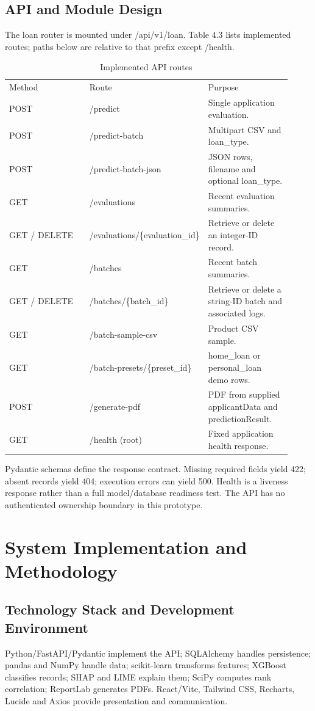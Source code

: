 \documentclass[12pt,a4paper]{report}
\begin{document}
\section{API and Module Design}
The loan router is mounted under /api/v1/loan. Table 4.3 lists implemented routes; paths below are relative to that prefix except /health.

\begin{longtable}{p{0.307\linewidth}p{0.307\linewidth}p{0.307\linewidth}}
\caption{Implemented API routes}\\

Method & Route & Purpose\\
POST & /predict & Single application evaluation.\\
POST & /predict-batch & Multipart CSV and loan\_type.\\
POST & /predict-batch-json & JSON rows, filename and optional loan\_type.\\
GET & /evaluations & Recent evaluation summaries.\\
GET / DELETE & /evaluations/\{evaluation\_id\} & Retrieve or delete an integer-ID record.\\
GET & /batches & Recent batch summaries.\\
GET / DELETE & /batches/\{batch\_id\} & Retrieve or delete a string-ID batch and associated logs.\\
GET & /batch-sample-csv & Product CSV sample.\\
GET & /batch-presets/\{preset\_id\} & home\_loan or personal\_loan demo rows.\\
POST & /generate-pdf & PDF from supplied applicantData and predictionResult.\\
GET & /health (root) & Fixed application health response.\\
\end{longtable}
Pydantic schemas define the response contract. Missing required fields yield 422; absent records yield 404; execution errors can yield 500. Health is a liveness response rather than a full model/database readiness test. The API has no authenticated ownership boundary in this prototype.

\chapter{System Implementation and Methodology}
\section{Technology Stack and Development Environment}
Python/FastAPI/Pydantic implement the API; SQLAlchemy handles persistence; pandas and NumPy handle data; scikit-learn transforms features; XGBoost classifies records; SHAP and LIME explain them; SciPy computes rank correlation; ReportLab generates PDFs. React/Vite, Tailwind CSS, Recharts, Lucide and Axios provide presentation and communication.
\end{document}
